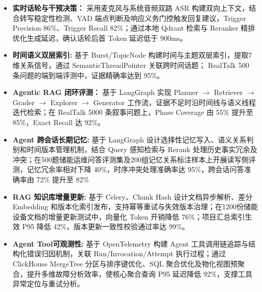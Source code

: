 
\begin{itemize}[itemsep=0.5ex, parsep=0ex]
    \item \textbf{实时话轮与干预决策：} 采用麦克风与系统音频双路 ASR 构建双向上下文，结合转写稳定性检测、VAD 端点判断及响应义务门控触发回复建议，Trigger Precision 86\%、Trigger Recall 82\%；通过本地 Qdrant 检索与 Reranker 精排优化生成延迟，确认话轮后首 Token 延迟低于 900ms。
    \item \textbf{时间语义双层索引:} 基于 Burst/TopicNode 构建时间与主题双层索引，提取7维关系信号，通过 SemanticThreadPointer 关联跨时间话题； RealTalk 500 条问题的端到端评测中，证据精确率达到 95\%。
    \item \textbf{Agentic RAG 闭环评测：} 基于 LangGraph 实现 Planner $\rightarrow$ Retriever $\rightarrow$ Grader $\rightarrow$ Explorer $\rightarrow$ Generator 工作流，证据不足时沿时间线与语义线程迭代检索；在 RealTalk 5000 条叙事问题上，Phase Coverage 由 55\% 提升至 85\%，Exact Recall 达 92\%。
\end{itemize}
\begin{itemize}[itemsep=0.5ex, parsep=0ex]
    \item \textbf{Agent 跨会话长期记忆:}  基于 LangGraph 设计选择性记忆写入、语义关系判别和时间版本管理机制，结合 Query 感知检索与 Rerank 处理历史事实冗余及冲突；在500题储能运维问答评测集及200组记忆关系标注样本上开展读写侧评测，记忆冗余率相对下降 40\%，时序冲突处理准确率达 95\%，跨会话问答准确率由 72\% 提升至 82\%
    \item \textbf{RAG 知识库增量更新:} 基于 Celery、Chunk Hash 设计文档异步解析、差分 Embedding 和版本化索引发布，支持幂等重试与失效版本治理；在1200份储能设备文档的增量更新测试中，向量化 Token 开销降低 76\%；项目汇总索引生效 P95 降低 42\%，版本更新一致性校验通过率达 99\%。
    \item \textbf{Agent Tool可观测性:} 基于 OpenTelemetry 构建 Agent 工具调用链追踪与结构化错误归因机制，关联 Run/Invocation/Attempt 执行过程；通过 ClickHouse MergeTree 分区与排序键优化、SQL 聚合优化及物化视图预聚合，提升多维故障分析效率，使核心聚合查询 P95 延迟降低 92\%，支撑工具异常定位与重试分析。
\end{itemize}

